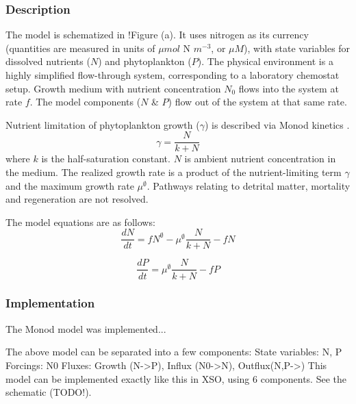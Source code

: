 \documentclass[journal abbreviation, manuscript]{copernicus}
\begin{document}
\subsubsection{Description}
The model is schematized in !Figure (a). It uses nitrogen as its currency (quantities are measured in units of $\mu mol$ N $m^{-3}$, or $\mu M$), with state variables for dissolved nutrients ($N$) and phytoplankton ($P$). The physical environment is a highly simplified flow-through system, corresponding to a laboratory chemostat setup. Growth medium with nutrient concentration $N_0$ flows into the system at rate $f$. The model components ($N$ \& $P$) flow out of the system at that same rate.

Nutrient limitation of phytoplankton growth ($\gamma$) is described via Monod kinetics \citep{Monod1942RecherchesBacteriennes}.
\begin{equation}
    \gamma = \frac{N}{k + N} 
\end{equation}
where $k$ is the half-saturation constant. $N$ is ambient nutrient concentration in the medium.
The realized growth rate is a product of the nutrient-limiting term $\gamma$ and the maximum growth rate $\mu^\emptyset$.
Pathways relating to detrital matter, mortality and regeneration are not resolved. 

The model equations are as follows:
\begin{equation}
    \frac{d N}{d t} = 
    f N^\emptyset %
    -  \mu^\emptyset \frac{N}{k + N} 
    - f N
\end{equation}

\begin{equation}
    \frac{d P}{d t} =
    \mu^\emptyset \frac{N}{k + N} 
    - f P
\end{equation}

\subsubsection{Implementation}
The Monod model was implemented...

The above model can be separated into a few components:
State variables: N, P
Forcings: N0
Fluxes: Growth (N->P), Influx (N0->N), Outflux(N,P->)
This model can be implemented exactly like this in XSO, using 6 components. See the schematic (TODO!).
\end{document}
